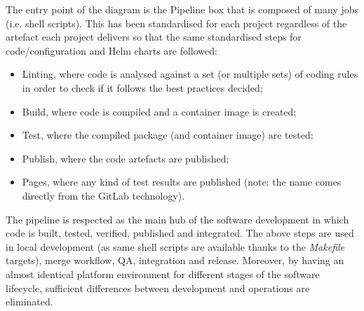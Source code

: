 \documentclass[a4paper,
               keeplastbox,   %
               ]{jacow}
\begin{document}
The entry point of the diagram is the Pipeline box that is composed of many jobs (i.e. shell scripts).  This has been standardised for each project regardless of the artefact each project delivers so that the same standardised steps for code/configuration and Helm charts are followed:
\begin{itemize}
    \item Linting, where code is analysed against a set (or multiple sets) of coding rules in order to check if it follows the best practices decided;
    \item Build, where code is compiled and a container image is created;
    \item Test, where the compiled package (and container image) are tested;
    \item Publish, where the code artefacts are published;
    \item Pages, where any kind of test results are published (note: the name comes directly from the GitLab technology).
\end{itemize}

The pipeline is respected as the main hub of the software development in which code is built, tested, verified, published and integrated. The above steps are used in local development (as same shell scripts are available thanks to the \textit{Makefile} targets), merge workflow, QA, integration and release. Moreover, by having an almost identical platform environment for different stages of the software lifecycle, sufficient differences between development and operations are eliminated.
\end{document}
